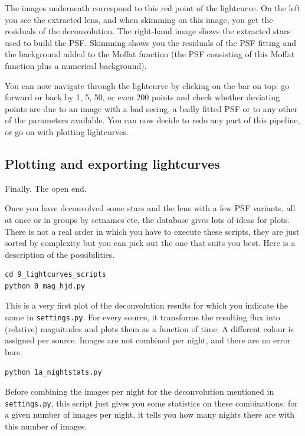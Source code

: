 The images underneath correspond to this red point of the lightcurve. On the left you see the extracted lens, and when skimming on this image, you get the residuals of the deconvolution. The right-hand image shows the extracted stars used to build the PSF. Skimming shows you the residuals of the PSF fitting and the background added to the Moffat function (the PSF consisting of this Moffat function plus a numerical background).

You can now navigate through the lightcurve by clicking on the bar on top: go forward or back by 1, 5, 50, or even 200 points and check whether deviating points are due to an image with a bad seeing, a badly fitted PSF or to any other of the parameters available. You can now decide to redo any part of this pipeline, or go on with plotting lightcurves. 

\subsection{Plotting and exporting lightcurves}

Finally. The open end.

Once you have deconvolved some stars and the lens with a few PSF variants, all at once or in groups by setnames etc, the database gives lots of ideas for plots. There is not a real order in which you have to execute these scripts, they are just sorted by complexity but you can pick out the one that suits you best. Here is a description of the  possibilities.

\begin{Verbatim}
cd 9_lightcurves_scripts
python 0_mag_hjd.py
\end{Verbatim}

This is a very first plot of the deconvolution results for which you indicate the name in \verb+settings.py+. For every source, it transforms the resulting flux into (relative) magnitudes and plots them as a function of time. A different colour is assigned per source. Images are not combined per night, and there are no error bars.

\begin{Verbatim}
python 1a_nightstats.py
\end{Verbatim}

Before combining the images per night for the deconvolution mentioned in \verb+settings.py+, this script just gives you some statistics on these combinations: for a given number of images per night, it tells you how many nights there are with this number of images.

